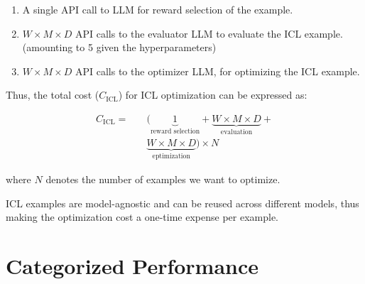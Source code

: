     \begin{enumerate}
        \item A single API call to LLM for reward selection of the example.
        \item $W \times M \times D$ API calls to the evaluator LLM to evaluate the ICL example. (amounting to 5 given the hyperparameters)
        \item $W \times M \times D$ API calls to the optimizer LLM, for optimizing the ICL example.
    \end{enumerate}

Thus, the total cost ($C_{\text{ICL}}$) for ICL optimization can be expressed as:

\begin{align*}
    C_{\text{ICL}} = \quad & (\underbrace{1}_{\text{reward selection}} + \underbrace{W \times M \times D}_{\text{evaluation}} + \\
    & \underbrace{W \times M \times D}_{\text{eptimization}} ) \times N
\end{align*}

where $N$ denotes the number of examples we want to optimize.

ICL examples are model-agnostic and can be reused across different models, thus making the optimization cost a one-time expense per example.

\newpage

\section{Categorized Performance}
\label{sec:cat_perf}


